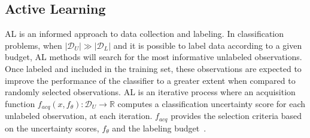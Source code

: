 % 
% 
% 
% 
% 
% 


\subsection{Active Learning}\label{sec:active-learning}

AL is an informed approach to data collection and labeling. In classification
problems, when $|\mathcal{D}_U| \gg |\mathcal{D}_L|$ and it is possible to
label data according to a given budget, AL methods will search for the most
informative unlabeled observations. Once labeled and included in the
training set, these observations are expected to improve the performance of
the classifier to a greater extent when compared to randomly selected
observations. AL is an iterative process where an acquisition function
$f_{acq}(x, f_\theta): \mathcal{D}_U \to \mathbb{R}$ computes a classification
uncertainty score for each unlabeled observation, at each iteration.
$f_{acq}$ provides the selection criteria based on the uncertainty scores,
$f_\theta$ and the labeling budget~\cite{Kim2021}.

